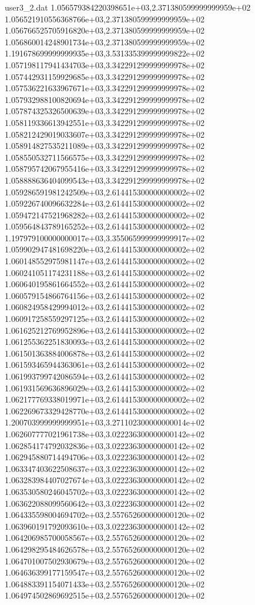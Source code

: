 \begin{filecontents}{user3_2.dat}
1.056579384220398651e+03,2.371380599999999959e+02
1.056521910556368766e+03,2.371380599999999959e+02
1.056766525705916820e+03,2.371380599999999959e+02
1.056860014248901734e+03,2.371380599999999959e+02
1.191678699999999935e+03,3.531335399999999822e+02
1.057198117941434703e+03,3.342291299999999978e+02
1.057442931159929685e+03,3.342291299999999978e+02
1.057536221633967671e+03,3.342291299999999978e+02
1.057932988100820694e+03,3.342291299999999978e+02
1.057874325326500639e+03,3.342291299999999978e+02
1.058119336613942551e+03,3.342291299999999978e+02
1.058212429019033607e+03,3.342291299999999978e+02
1.058914827535211089e+03,3.342291299999999978e+02
1.058550532711566575e+03,3.342291299999999978e+02
1.058795742067955416e+03,3.342291299999999978e+02
1.058888636404099543e+03,3.342291299999999978e+02
1.059286591981242509e+03,2.614415300000000002e+02
1.059226740096632284e+03,2.614415300000000002e+02
1.059472147521968282e+03,2.614415300000000002e+02
1.059564843789165252e+03,2.614415300000000002e+02
1.197979100000000017e+03,3.355065999999999917e+02
1.059902947481698220e+03,2.614415300000000002e+02
1.060148552975981147e+03,2.614415300000000002e+02
1.060241051174231188e+03,2.614415300000000002e+02
1.060640195861664552e+03,2.614415300000000002e+02
1.060579154866764156e+03,2.614415300000000002e+02
1.060824958429994012e+03,2.614415300000000002e+02
1.060917258559297125e+03,2.614415300000000002e+02
1.061625212769952896e+03,2.614415300000000002e+02
1.061255362251830093e+03,2.614415300000000002e+02
1.061501363884006878e+03,2.614415300000000002e+02
1.061593465944363061e+03,2.614415300000000002e+02
1.061993799742086594e+03,2.614415300000000002e+02
1.061931569636896029e+03,2.614415300000000002e+02
1.062177769338019971e+03,2.614415300000000002e+02
1.062269673329428770e+03,2.614415300000000002e+02
1.200703999999999951e+03,3.271102300000000014e+02
1.062607777021961738e+03,3.022236300000000142e+02
1.062854174792032836e+03,3.022236300000000142e+02
1.062945880714494706e+03,3.022236300000000142e+02
1.063347403622508637e+03,3.022236300000000142e+02
1.063283984407027674e+03,3.022236300000000142e+02
1.063530580246045702e+03,3.022236300000000142e+02
1.063622088099560642e+03,3.022236300000000142e+02
1.064335598004694702e+03,2.557652600000000120e+02
1.063960191792093610e+03,3.022236300000000142e+02
1.064206985700058567e+03,2.557652600000000120e+02
1.064298295484626578e+03,2.557652600000000120e+02
1.064701007502930679e+03,2.557652600000000120e+02
1.064636399177159547e+03,2.557652600000000120e+02
1.064883391154071433e+03,2.557652600000000120e+02
1.064974502869692515e+03,2.557652600000000120e+02

\end{filecontents}
